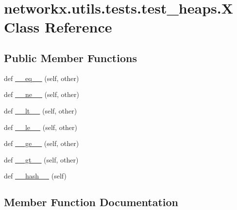\hypertarget{classnetworkx_1_1utils_1_1tests_1_1test__heaps_1_1X}{}\section{networkx.\+utils.\+tests.\+test\+\_\+heaps.\+X Class Reference}
\label{classnetworkx_1_1utils_1_1tests_1_1test__heaps_1_1X}
\subsection*{Public Member Functions}
\begin{DoxyCompactItemize}
\item 
def \hyperlink{classnetworkx_1_1utils_1_1tests_1_1test__heaps_1_1X_a931f3009d9412ec9a7d0be91d7b6487b}{\+\_\+\+\_\+eq\+\_\+\+\_\+} (self, other)
\item 
def \hyperlink{classnetworkx_1_1utils_1_1tests_1_1test__heaps_1_1X_a2f64aaf1f365f5ab117d27d555fec684}{\+\_\+\+\_\+ne\+\_\+\+\_\+} (self, other)
\item 
def \hyperlink{classnetworkx_1_1utils_1_1tests_1_1test__heaps_1_1X_a0bf298b7187fc2cefe06947dbd32abc7}{\+\_\+\+\_\+lt\+\_\+\+\_\+} (self, other)
\item 
def \hyperlink{classnetworkx_1_1utils_1_1tests_1_1test__heaps_1_1X_acc16aadedd316af11c32dbd6d1404dac}{\+\_\+\+\_\+le\+\_\+\+\_\+} (self, other)
\item 
def \hyperlink{classnetworkx_1_1utils_1_1tests_1_1test__heaps_1_1X_a27572607550c85c1a542119950b493b8}{\+\_\+\+\_\+ge\+\_\+\+\_\+} (self, other)
\item 
def \hyperlink{classnetworkx_1_1utils_1_1tests_1_1test__heaps_1_1X_a8a061bb25fc4a83c79fc38228b86a6db}{\+\_\+\+\_\+gt\+\_\+\+\_\+} (self, other)
\item 
def \hyperlink{classnetworkx_1_1utils_1_1tests_1_1test__heaps_1_1X_ae958f7cf0f971ee0063c66ef3e2b0b9a}{\+\_\+\+\_\+hash\+\_\+\+\_\+} (self)
\end{DoxyCompactItemize}


\subsection{Member Function Documentation}
\mbox{\label{classnetworkx_1_1utils_1_1tests_1_1test__heaps_1_1X_a931f3009d9412ec9a7d0be91d7b6487b}} 
